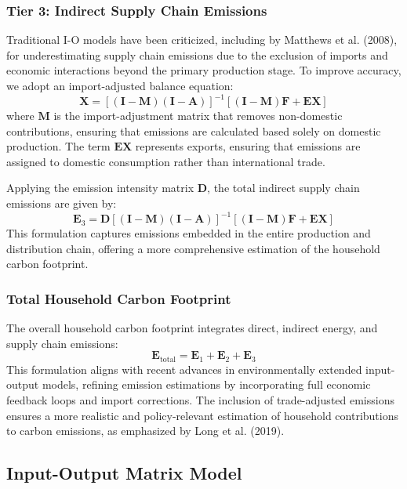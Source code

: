 \documentclass[12pt,a4paper]{article}%
\begin{document}
\subsubsection*{Tier 3: Indirect Supply Chain Emissions}
Traditional I-O models have been criticized, including by Matthews et al. (2008), for underestimating supply chain emissions due to the exclusion of imports and economic interactions beyond the primary production stage. To improve accuracy, we adopt an import-adjusted balance equation:
\begin{equation}
    \mathbf{X} = [(\mathbf{I} - \mathbf{M}) (\mathbf{I} - \mathbf{A})]^{-1} [(\mathbf{I} - \mathbf{M}) \mathbf{F} + \mathbf{EX}]
\end{equation}
where \( \mathbf{M} \) is the import-adjustment matrix that removes non-domestic contributions, ensuring that emissions are calculated based solely on domestic production. The term \( \mathbf{EX} \) represents exports, ensuring that emissions are assigned to domestic consumption rather than international trade.

Applying the emission intensity matrix \( \mathbf{D} \), the total indirect supply chain emissions are given by:
\begin{equation}
    \mathbf{E}_3 = \mathbf{D} [(\mathbf{I} - \mathbf{M}) (\mathbf{I} - \mathbf{A})]^{-1} [(\mathbf{I} - \mathbf{M}) \mathbf{F} + \mathbf{EX}]
\end{equation}
This formulation captures emissions embedded in the entire production and distribution chain, offering a more comprehensive estimation of the household carbon footprint.

\subsubsection*{Total Household Carbon Footprint}
The overall household carbon footprint integrates direct, indirect energy, and supply chain emissions:
\begin{equation}
    \mathbf{E}_{\text{total}} = \mathbf{E}_1 + \mathbf{E}_2 + \mathbf{E}_3
\end{equation}
This formulation aligns with recent advances in environmentally extended input-output models, refining emission estimations by incorporating full economic feedback loops and import corrections. The inclusion of trade-adjusted emissions ensures a more realistic and policy-relevant estimation of household contributions to carbon emissions, as emphasized by Long et al. (2019).

\subsection{Input-Output Matrix Model}
\end{document}
